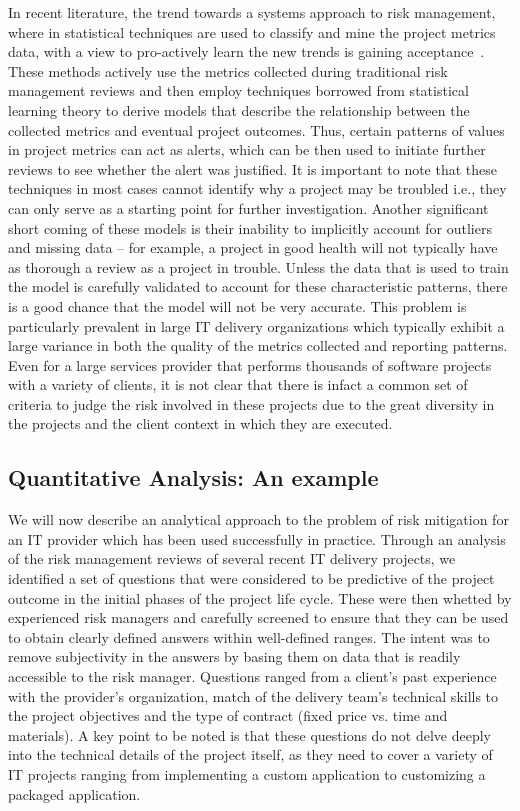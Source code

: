 In recent literature, the trend towards a systems approach to risk management, where in statistical techniques are used to classify and mine the project metrics data, with a view to pro-actively learn the new trends is gaining acceptance~\cite{risk8,risk9,risk10}.  These methods actively use the metrics collected during traditional risk management reviews and then employ techniques borrowed from statistical learning theory to derive models that describe the relationship between the collected metrics and eventual project outcomes. Thus, certain patterns of values in project metrics can act as alerts, which can be then used to initiate further reviews to see whether the alert was justified. It is important to note that these techniques in most cases cannot identify why a project may be troubled i.e., they can only serve as a starting point for further investigation.  Another significant short coming of these models is their inability to implicitly account for outliers and missing data -- for example, a project in good health will not typically have as thorough a review as a project in trouble. Unless the data that is used to train the model is carefully validated to account for these characteristic patterns, there is a good chance that the model will not be very accurate. This problem is particularly prevalent in large IT delivery organizations which typically exhibit a large variance in both the quality of the metrics collected and reporting patterns. Even for a large services provider that performs thousands of software projects with a variety of clients, it is not clear that there is infact a common set of criteria to judge the risk involved in these projects due to the great diversity in the projects and the client context in which they are executed.

\subsection{Quantitative Analysis: An example}

We will now describe an analytical approach to the problem of risk mitigation for an IT provider which has been used successfully in practice. Through an analysis of the risk management reviews of several recent IT delivery projects, we identified a set of questions that were considered to be predictive of the project outcome in the initial phases of the project life cycle. These were then whetted by experienced risk managers and carefully screened to ensure that they can be used to obtain clearly defined answers within well-defined ranges. The intent was to remove subjectivity in the answers by basing them on data that is readily accessible to the risk manager.  Questions ranged from a client's past experience with the provider's organization, match of the delivery team's technical skills to the project objectives and the type of contract (fixed price vs. time and materials).  A key point to be noted is that these questions do not delve deeply into the technical details of the project itself, as they need to cover a variety of IT projects ranging from implementing a custom application to customizing a packaged application.

